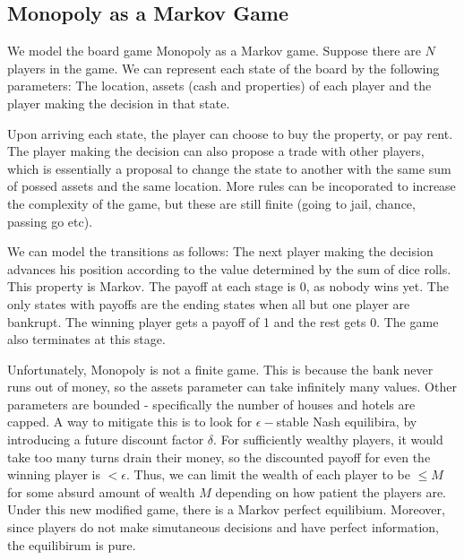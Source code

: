 \subsection*{Monopoly as a Markov Game}
    We model the board game Monopoly as a Markov game. Suppose there are $N$ players in the game. We can represent each state of the board by the following parameters: The location, assets (cash and properties) of each player and the player making the decision in that state. 

    Upon arriving each state, the player can choose to buy the property, or pay rent. The player making the decision can also propose a trade with other players, which is essentially a proposal to change the state to another with the same sum of possed assets and the same location. More rules can be incoporated to increase the complexity of the game, but these are still finite (going to jail, chance, passing go etc).

    We can model the transitions as follows: The next player making the decision advances his position according to the value determined by the sum of dice rolls. This property is Markov.
    The payoff at each stage is $0$, as nobody wins yet. The only states with payoffs are the ending states when all but one player are bankrupt. The winning player gets a payoff of 1 and the rest gets 0. The game also terminates at this stage.

Unfortunately, Monopoly is not a finite game. This is because the bank never runs out of money, so the assets parameter can take infinitely many values. Other parameters are bounded - specifically the number of houses and hotels are capped. A way to mitigate this is to look for $\epsilon-$stable Nash equilibira, by introducing a future discount factor $\delta$. For sufficiently wealthy players, it would take too many turns drain their money, so the discounted payoff for even the winning player is $<\epsilon$. Thus, we can limit the wealth of each player to be $\leq M$ for some absurd amount of wealth $M$ depending on how patient the players are. Under this new modified game, there is a Markov perfect equilibium. Moreover, since players do not make simutaneous decisions and have perfect information, the equilibirum is pure.
